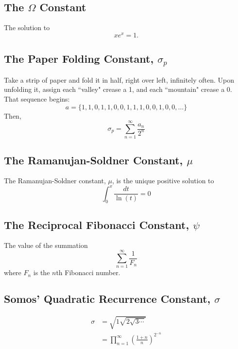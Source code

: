 \documentclass[12pt]{article}
\begin{document}
\subsection{The $\Omega$ Constant}
The solution to
\begin{equation*}
x e^{x} = 1 .
\end{equation*}

\subsection{The Paper Folding Constant, $\sigma_{p}$}
Take a strip of paper and fold it in half, right over left, infinitely often. Upon unfolding it, assign each ``valley" crease a 1, and each ``mountain" crease a 0. That sequence begins:
\begin{equation*}
a = \{1,1,0,1,1,0,0,1,1,1,0,0,1,0,0, \ldots\}
\end{equation*}
Then,
\begin{equation*}
\sigma_{p} = \sum_{n=1}^{\infty} \frac{a_{n}}{2^{n}}
\end{equation*}

\subsection{The Ramanujan-Soldner Constant, $\mu$}
The Ramanujan-Soldner constant, $\mu$, is the unique positive solution to
\begin{equation*}
\int_{0}^{x} \frac{dt}{\ln(t)} = 0
\end{equation*}

\subsection{The Reciprocal Fibonacci Constant, $\psi$}
The value of the summation
\begin{equation*}
\sum_{n = 1}^{\infty} \frac{1}{F_{n}}
\end{equation*}
where $F_{n}$ is the $n$th Fibonacci number.

\subsection{Somos' Quadratic Recurrence Constant, $\sigma$}
\begin{align*}
\sigma &= \sqrt{1 \sqrt{2 \sqrt{3\cdots} }}\\
&= \prod_{n = 1}^{\infty} \left( \frac{1 + n}{n} \right)^{2^{-n}}
\end{align*}
\end{document}

